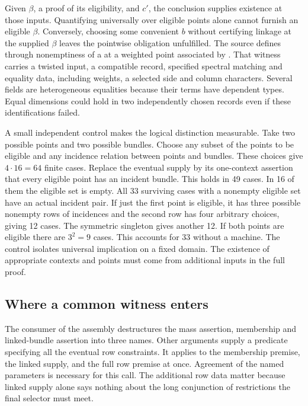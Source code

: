 \documentclass[12pt,letterpaper]{article}
\begin{document}
Given $\beta$, a proof of its eligibility, and $c'$, the conclusion supplies existence at those inputs. Quantifying universally over eligible points alone cannot furnish an eligible $\beta$. Conversely, choosing some convenient $b$ without certifying linkage at the supplied $\beta$ leaves the pointwise obligation unfulfilled. The source defines  through nonemptiness of a  at a weighted point associated by . That witness carries a twisted input, a compatible record, specified spectral matching and equality data, including weights, a selected side and column characters. Several fields are heterogeneous equalities because their terms have dependent types. Equal dimensions could hold in two independently chosen records even if these identifications failed. 

A small independent control makes the logical distinction measurable. Take two possible points and two possible bundles. Choose any subset of the points to be eligible and any incidence relation between points and bundles. These choices give $4\cdot16=64$ finite cases. Replace the eventual supply by its one-context assertion that every eligible point has an incident bundle. This holds in 49 cases. In 16 of them the eligible set is empty. All 33 surviving cases with a nonempty eligible set have an actual incident pair. If just the first point is eligible, it has three possible nonempty rows of incidences and the second row has four arbitrary choices, giving 12 cases. The symmetric singleton gives another 12. If both points are eligible there are $3^2=9$ cases. This accounts for 33 without a machine. The control isolates universal implication on a fixed domain. The existence of appropriate contexts and points must come from additional inputs in the full proof.

\subsection{Where a common witness enters}
The consumer of the assembly destructures the mass assertion, membership and linked-bundle assertion into three names. Other arguments supply a predicate specifying all the eventual row constraints. It applies  to the membership premise, the linked supply, and the full row premise at once. Agreement of the named parameters is necessary for this call. The additional row data matter because linked supply alone says nothing about the long conjunction of restrictions the final selector must meet. 
\end{document}
